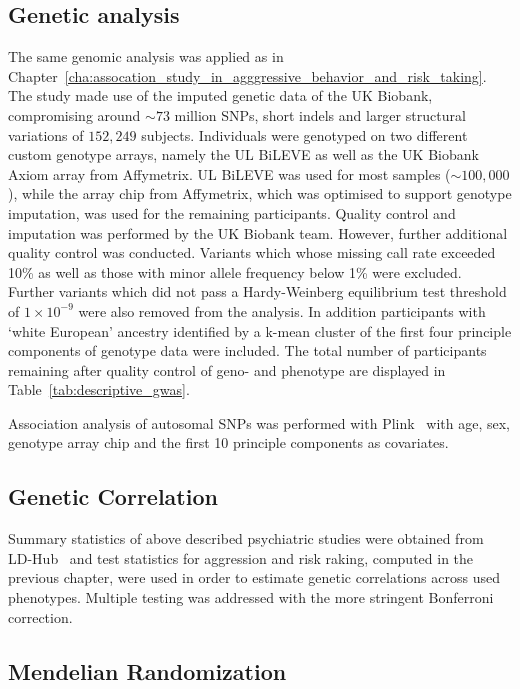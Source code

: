 \subsection{Genetic analysis}
\label{sub:genetic_analysis}

The same genomic analysis was applied as in Chapter~\ref{cha:assocation_study_in_agggressive_behavior_and_risk_taking}.
The study made use of the imputed genetic data of the UK Biobank, compromising around $\sim73$ million SNPs, short indels and larger structural variations of $152,249$ subjects.
Individuals were genotyped on two different custom genotype arrays, namely the UL BiLEVE as well as the UK Biobank Axiom array from Affymetrix. 
UL BiLEVE was used for most samples ($\sim100,000$), while the array chip from Affymetrix, which was optimised to support genotype imputation, was used for the remaining participants. 
Quality control and imputation was performed by the UK Biobank team.
However, further additional quality control was conducted.
Variants which whose missing call rate exceeded 10\% as well as those with minor allele frequency below 1\% were excluded.
Further variants which did not pass a Hardy-Weinberg equilibrium test threshold of $1\times10^{-9}$ were also removed from the analysis.
In addition participants with `white European' ancestry identified by a k-mean cluster of the first four principle components of genotype data were included.
The total number of participants remaining after quality control of geno- and phenotype are displayed in Table~\ref{tab:descriptive_gwas}.

Association analysis of autosomal SNPs was performed with Plink~\cite{Purcell2007,Chang2015} with age, sex, genotype array chip and the first 10 principle components as covariates.

\subsection{Genetic Correlation}
\label{sub:genetic_correlation}

Summary statistics of above described psychiatric studies were obtained from LD-Hub~\cite{ZHENG2016} and test statistics for aggression and risk raking, computed in the previous chapter, were used in order to estimate genetic correlations across used phenotypes.
Multiple testing was addressed with the more stringent Bonferroni correction.

\subsection{Mendelian Randomization}
\label{sub:joint_association_study}

